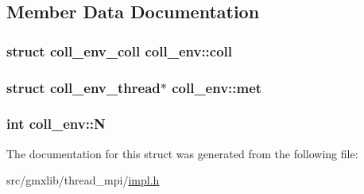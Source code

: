 \subsection{\-Member \-Data \-Documentation}
\hypertarget{structcoll__env_a47d1663e7773c457d5da0bdcbcfeadfb}{
\subsubsection[{coll}]{\setlength{\rightskip}{0pt plus 5cm}struct {\bf coll\-\_\-env\-\_\-coll} {\bf coll\-\_\-env\-::coll}}}\label{structcoll__env_a47d1663e7773c457d5da0bdcbcfeadfb}
\hypertarget{structcoll__env_afef5ad9b367d1d9b1898f29973971395}{
\subsubsection[{met}]{\setlength{\rightskip}{0pt plus 5cm}struct {\bf coll\-\_\-env\-\_\-thread}$\ast$ {\bf coll\-\_\-env\-::met}}}\label{structcoll__env_afef5ad9b367d1d9b1898f29973971395}
\hypertarget{structcoll__env_aae0cf3b2f94c5a0a2e69308fc35afa19}{
\subsubsection[{\-N}]{\setlength{\rightskip}{0pt plus 5cm}int {\bf coll\-\_\-env\-::\-N}}}\label{structcoll__env_aae0cf3b2f94c5a0a2e69308fc35afa19}


\-The documentation for this struct was generated from the following file\-:\begin{DoxyCompactItemize}
\item 
src/gmxlib/thread\-\_\-mpi/\hyperlink{impl_8h}{impl.\-h}\end{DoxyCompactItemize}
